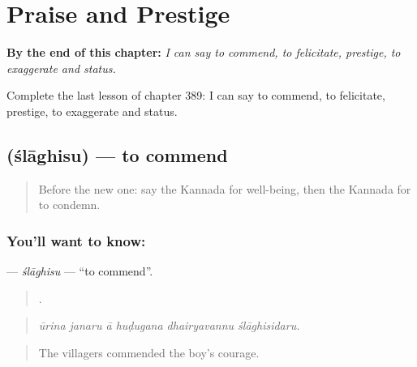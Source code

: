 
\chapter{Praise and Prestige}
\label{ch:ka-praise-and-prestige}

\begin{chapteropening}
\textbf{By the end of this chapter:} \emph{I can say to commend, to felicitate, prestige, to exaggerate and status.}

Complete the last lesson of chapter 389: I can say to commend, to felicitate, prestige, to exaggerate and status.
\end{chapteropening}

\section[\texorpdfstring{\kn{ಶ್ಲಾಘಿಸು} (ślāghisu)}{ಶ್ಲಾಘಿಸು (ślāghisu)}]{ (ślāghisu) — to commend}

\label{lesson:KA-C389-slaghisu}



\begin{quote}
Before the new one: say the Kannada for well-being, then the Kannada for to condemn.
\end{quote}

\subsection*{You'll want to know: }
\textbf{} — \emph{ślāghisu} — \textquotedblleft{}to commend\textquotedblright{}.

\begin{quote}
     .
\end{quote}

\begin{quote}
\emph{ūrina janaru ā huḍugana dhairyavannu ślāghisidaru.}
\end{quote}

\begin{quote}
The villagers commended the boy's courage.
\end{quote}

